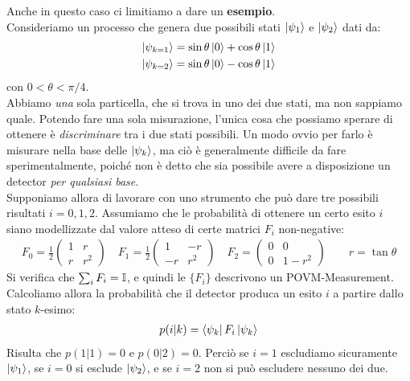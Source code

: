 \documentclass[../../InformazioneQuantistica.tex]{subfiles}
\begin{document}
Anche in questo caso ci limitiamo a dare un \textbf{esempio}.\\
Consideriamo un processo che genera due possibili stati $\Ket{\psi_1}$ e $\Ket{\psi_2}$ dati da:
\begin{align*}
\Ket{\psi_{k=1}} &= \sin\theta \Ket{0} + \cos\theta \Ket{1}\\
\Ket{\psi_{k=2}} &= \sin\theta \Ket{0} - \cos\theta \Ket{1}
\end{align*}
con $0 < \theta < \pi/4$.\\
Abbiamo \textit{una} sola particella, che si trova in uno dei due stati, ma non sappiamo quale. Potendo fare una sola misurazione, l'unica cosa che possiamo sperare di ottenere è \textit{discriminare} tra i due stati possibili. Un modo ovvio per farlo è misurare nella base delle $\Ket{\psi_k}$, ma ciò è generalmente difficile da fare sperimentalmente, poiché non è detto che sia possibile avere a disposizione un detector \textit{per qualsiasi base}.\\

Supponiamo allora di lavorare con uno strumento che può dare tre possibili risultati $i=0,1,2$. Assumiamo che le probabilità di ottenere un certo esito $i$ siano modellizzate dal valore atteso di certe matrici $F_i$ non-negative:
\begin{align*}
F_0 = \frac{1}{2}\begin{pmatrix}
1 & r\\
r & r^2\end{pmatrix}
\quad F_1 = \frac{1}{2}\begin{pmatrix} 1 & -r\\ -r & r^2 \end{pmatrix}\quad
F_2 = \begin{pmatrix} 0 & 0\\ 0 & 1-r^2 \end{pmatrix} \qquad r=\tan\theta
\end{align*}
Si verifica che $\sum_i F_i = \mathbb{I}$, e quindi le $\{F_i\}$ descrivono un POVM-Measurement.\\

Calcoliamo allora la probabilità che il detector produca un esito $i$ a partire dallo stato $k$-esimo:
\begin{align*}
p(i|k) = \Bra{\psi_k}F_i \Ket{\psi_k}
\end{align*}
Risulta che $p(1|1) = 0$ e $p(0|2)=0$. Perciò se $i=1$ escludiamo sicuramente $\Ket{\psi_1}$, se $i=0$ si esclude $\Ket{\psi_2}$, e se $i=2$ non si può escludere nessuno dei due.
\end{document}
